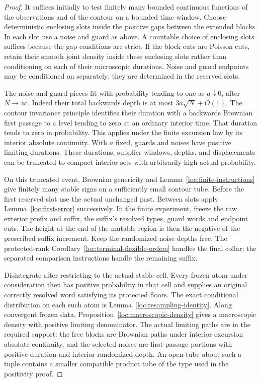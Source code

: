 \begin{proof}
It suffices initially to test finitely many bounded continuous functions
of the observations and of the contour on a bounded time window.
Choose deterministic enclosing slots inside the positive gaps between
the extended blocks.  In each slot use a noise and guard as above.  A
countable choice of enclosing slots suffices because the gap conditions
are strict.  If the block cuts are Poisson cuts, retain their smooth
joint density inside these enclosing slots rather than conditioning on
each of their microscopic durations.  Noise and guard endpoints may be
conditioned on separately; they are determined in the reserved slots.

The noise and guard pieces fit with probability tending to one as
$a\downarrow0$, after $N\to\infty$.  Indeed their total backwards
depth is at most $3a\sqrt N+O(1)$.  The contour invariance principle
identifies their duration with a backwards Brownian first passage to a
level tending to zero at an ordinary interior time.  That duration tends
to zero in probability.  This applies under the finite excursion law
by its interior absolute continuity.  With $a$ fixed, guards and noises
have positive limiting durations.  These durations, supplier windows,
depths, and displacements can be truncated to compact interior sets
with arbitrarily high actual probability.

On this truncated event, Brownian genericity and
Lemma~\ref{loc:finite-instructions} give finitely many stable signs on
a sufficiently small contour tube.  Before the first reserved slot use
the actual unchanged past.  Between slots apply
Lemma~\ref{loc:first-error} successively.  In the finite experiment,
freeze the raw exterior prefix and suffix, the suffix's resolved types,
guard words and endpoint cuts.  The height at the end of the mutable
region is then the negative of the prescribed suffix increment.
Keep the randomized noise depths free.  The protected-rank
Corollary~\ref{loc:terminal-flexible-orders} handles the final collar;
the separated comparison instructions handle the remaining suffix.

Disintegrate after restricting to the actual stable cell.  Every frozen
atom under consideration then has positive probability in that cell and
supplies an original correctly resolved word satisfying its protected
floors.  The exact conditional distribution on each such atom is
Lemma~\ref{loc:resampling-identity}.  Along convergent frozen
data, Proposition~\ref{loc:macroscopic-density} gives a macroscopic
density with positive limiting denominator.  The actual limiting paths
are in the required support: the free blocks are Brownian paths under
interior excursion absolute continuity, and the selected noises are
first-passage portions with positive duration and interior randomized
depth.  An open tube about such a tuple contains a smaller compatible
product tube of the type used in the positivity proof.


\end{proof}
